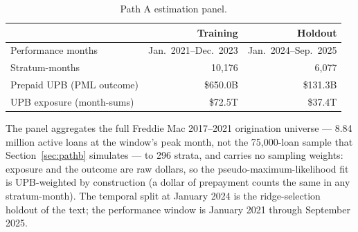 \documentclass[12pt]{article}
\begin{document}
\begin{table}[t]
\centering
\small
\begin{threeparttable}
\caption{Path A estimation panel.}
\label{tab:panel}
\begin{tabular}{@{}lrr@{}}
\toprule
 & Training & Holdout \\
\midrule
Performance months & Jan.\ 2021--Dec.\ 2023 & Jan.\ 2024--Sep.\ 2025 \\
Stratum-months & 10,176 & 6,077 \\
Prepaid UPB (PML outcome) & \$650.0B & \$131.3B \\
UPB exposure (month-sums) & \$72.5T & \$37.4T \\
\bottomrule
\end{tabular}
\begin{tablenotes}[flushleft]\footnotesize
\item The panel aggregates the full Freddie Mac 2017--2021 origination universe --- 8.84 million active loans at the window's peak month, not the 75,000-loan sample that Section~\ref{sec:pathb} simulates --- to 296 strata, and carries no sampling weights: exposure and the outcome are raw dollars, so the pseudo-maximum-likelihood fit is UPB-weighted by construction (a dollar of prepayment counts the same in any stratum-month). The temporal split at January 2024 is the ridge-selection holdout of the text; the performance window is January 2021 through September 2025.
\end{tablenotes}
\end{threeparttable}
\end{table}
\end{document}
